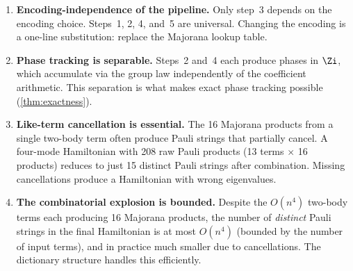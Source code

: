 \begin{enumerate}
  \item \textbf{Encoding-independence of the pipeline.}  Only step~3
    depends on the encoding choice.  Steps~1, 2, 4, and~5 are
    universal.  Changing the encoding is a one-line substitution:
    replace the Majorana lookup table.

  \item \textbf{Phase tracking is separable.}  Steps~2 and~4 each
    produce phases in $\Zi$, which accumulate via the group law
    independently of the coefficient arithmetic.  This separation is
    what makes exact phase tracking possible
    (\cref{thm:exactness}).

  \item \textbf{Like-term cancellation is essential.}  The 16
    Majorana products from a single two-body term often produce
    Pauli strings that partially cancel.  A four-mode Hamiltonian
    with 208 raw Pauli products (13 terms $\times$ 16 products) reduces
    to just 15 distinct Pauli strings after combination.  Missing
    cancellations produce a Hamiltonian with wrong eigenvalues.

  \item \textbf{The combinatorial explosion is bounded.}  Despite the
    $O(n^4)$ two-body terms each producing 16 Majorana products, the
    number of \emph{distinct} Pauli strings in the final Hamiltonian
    is at most $O(n^4)$ (bounded by the number of input terms), and
    in practice much smaller due to cancellations.  The dictionary
    structure handles this efficiently.
\end{enumerate}

